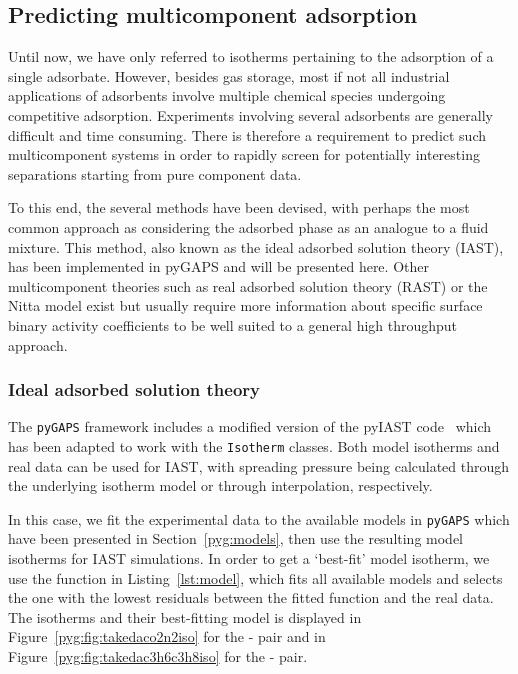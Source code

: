 
\subsection{Predicting multicomponent adsorption}

Until now, we have only referred to isotherms pertaining to the adsorption
of a single adsorbate. However, besides gas storage, most if not all
industrial applications of adsorbents involve multiple chemical 
species undergoing competitive adsorption. Experiments involving
several adsorbents are generally difficult and time consuming.
There is therefore a requirement to predict such multicomponent systems
in order to rapidly screen for potentially interesting separations
starting from pure component data.

To this end, the several methods have been devised, with perhaps
the most common approach as considering the adsorbed phase as 
an analogue to a fluid mixture. This method, also known as the 
ideal adsorbed solution theory (IAST), has been implemented in
pyGAPS and will be presented here. Other multicomponent theories
such as real adsorbed solution theory (RAST) or the Nitta model
exist but usually require more information about specific
surface binary activity coefficients to be well suited to a
general high throughput approach.

\subsubsection{Ideal adsorbed solution theory}

The \texttt{pyGAPS} framework includes a modified version of 
the pyIAST code~\cite{simonPyIASTIdealAdsorbed2016} which has 
been adapted to work with the \texttt{Isotherm} 
classes. Both model isotherms and real data can be used for 
IAST, with spreading pressure being calculated through the 
underlying isotherm model or through interpolation, respectively. 

In this case, we fit the experimental data to the available models 
in \texttt{pyGAPS} which have been presented in Section~\ref{pyg:models},
then use the resulting model isotherms for IAST simulations. 
In order to get a `best-fit' model isotherm,
we use the function in Listing~\ref{lst:model},
which fits all available models and selects the one with the lowest 
residuals between the fitted function and the real data.
The isotherms and their best-fitting model is displayed in 
Figure~\ref{pyg:fig:takedaco2n2iso} for the - pair and 
in Figure~\ref{pyg:fig:takedac3h6c3h8iso} for the - pair.

